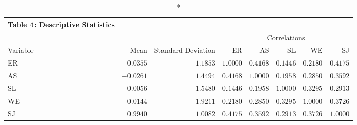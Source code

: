 \begin{longtable}{lrrrrrrr}
\caption*{
{\large Table 4: Descriptive Statistics}
} \\ 
\toprule
 &  &  & \multicolumn{5}{c}{Correlations} \\ 
\cmidrule(lr){4-8}
Variable & Mean & Standard Deviation & ER & AS & SL & WE & SJ \\ 
\midrule\addlinespace[2.5pt]
ER & $-0.0355$ & $1.1853$ & $1.0000$ & $0.4168$ & $0.1446$ & $0.2180$ & $0.4175$ \\ 
AS & $-0.0261$ & $1.4494$ & $0.4168$ & $1.0000$ & $0.1958$ & $0.2850$ & $0.3592$ \\ 
SL & $-0.0056$ & $1.5480$ & $0.1446$ & $0.1958$ & $1.0000$ & $0.3295$ & $0.2913$ \\ 
WE & $0.0144$ & $1.9211$ & $0.2180$ & $0.2850$ & $0.3295$ & $1.0000$ & $0.3726$ \\ 
SJ & $0.9940$ & $1.0082$ & $0.4175$ & $0.3592$ & $0.2913$ & $0.3726$ & $1.0000$ \\ 
\bottomrule
\end{longtable}

